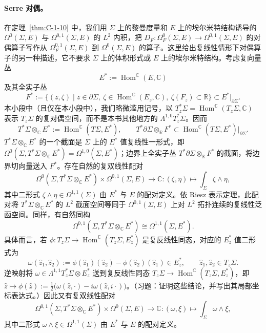 \paragraph{Serre 对偶。} 在定理~\ref{thm:C-1-10} 中，我们用 $\Sigma$ 上的黎曼度量和 $E$ 上的埃尔米特结构诱导的 $\Omega^0(\Sigma,E)$ 与 $\Omega^{0,1}(\Sigma,E)$ 的 $L^2$ 内积，把 $D_F:\Omega_F^0(\Sigma,E)\to\Omega^{0,1}(\Sigma,E)$ 的对偶算子写作从 $\Omega_F^{0,1}(\Sigma,E)$ 到 $\Omega^0(\Sigma,E)$ 的算子。这里给出复线性情形下对偶算子的另一种描述，它不要求 $\Sigma$ 上的体积形式或 $E$ 上的埃尔米特结构。考虑复向量丛
\[
  E^*:=\operatorname{Hom}^{\mathbb C}(E,\mathbb C)
\]
及其全实子丛
\[
  F^*:=\{(z,\zeta)\mid z\in\partial\Sigma,\
  \zeta\in\operatorname{Hom}^{\mathbb C}(E_z,\mathbb C),\
  \zeta(F_z)\subset\mathbb R\}\subset E^*|_{\partial\Sigma}.
\]
本小段中（且仅在本小段中），我们略微滥用记号，以 $T_z^*\Sigma=\operatorname{Hom}^{\mathbb C}(T_z\Sigma,\mathbb C)$ 表示 $T_z\Sigma$ 的复对偶空间，而不是本书其他地方的 $\Lambda^{1,0}T_z^*\Sigma$。因而
\[
  T^*\Sigma\otimes_{\mathbb C}E^*:=\operatorname{Hom}^{\mathbb C}(T\Sigma,E^*),
  \qquad
  T^*\partial\Sigma\otimes_{\mathbb R}F^*
  \subset\operatorname{Hom}^{\mathbb C}(T\Sigma,E^*)|_{\partial\Sigma}.
\]
$T^*\Sigma\otimes_{\mathbb C}E^*$ 的一个截面是 $\Sigma$ 上的 $E^*$ 值复线性一形式，即 $\Omega^0(\Sigma,T^*\Sigma\otimes_{\mathbb C}E^*)=\Omega^{1,0}(\Sigma,E^*)$；边界上全实子丛 $T^*\partial\Sigma\otimes_{\mathbb R}F^*$ 的截面，将边界切向量送入 $F^*$。存在自然的复双线性配对
\begin{equation}\label{eq:C-1-5}
  \Omega^0(\Sigma,T^*\Sigma\otimes_{\mathbb C}E^*)
  \times\Omega^{0,1}(\Sigma,E)
  \longrightarrow\mathbb C:
  (\zeta,\eta)\longmapsto\int_\Sigma\zeta\wedge\eta,
\end{equation}
其中二形式 $\zeta\wedge\eta\in\Omega^{1,1}(\Sigma)$ 由 $E^*$ 与 $E$ 的配对定义。依 Riesz 表示定理，此配对将 $T^*\Sigma\otimes_{\mathbb C}E^*$ 的 $L^2$ 截面空间等同于 $\Omega^{0,1}(\Sigma,E)$ 上对 $L^2$ 拓扑连续的复线性泛函空间。同样，有自然同构
\[
  \Omega^{0,1}(\Sigma,T^*\Sigma\otimes_{\mathbb C}E^*)
  \cong\Omega^{1,1}(\Sigma,E^*).
\]
具体而言，若 $\phi:T_z\Sigma\to\operatorname{Hom}^{\mathbb C}(T_z\Sigma,E_z^*)$ 是复反线性同态，对应的 $E_z^*$ 值二形式为
\begin{equation}\label{eq:C-1-6}
  \omega(\hat z_1,\hat z_2):=
  \phi(\hat z_1)(\hat z_2)-\phi(\hat z_2)(\hat z_1)
  \in E_z^*,\qquad \hat z_1,\hat z_2\in T_z\Sigma.
\end{equation}
逆映射将 $\omega\in\Lambda^{1,1}T_z^*\Sigma\otimes E_z^*$ 送到复反线性同态 $T_z\Sigma\to\operatorname{Hom}^{\mathbb C}(T_z\Sigma,E_z^*)$，即 $\hat z\mapsto\phi(\hat z):=\frac12\bigl(\omega(\hat z,\cdot)-i\omega(\hat z,i\cdot)\bigr)$。（习题：证明这些结论，并写出其局部坐标表达式。）因此又有复双线性配对
\begin{equation}\label{eq:C-1-7}
  \Omega^{0,1}(\Sigma,T^*\Sigma\otimes_{\mathbb C}E^*)
  \times\Omega^0(\Sigma,E)
  \longrightarrow\mathbb C:
  (\omega,\xi)\longmapsto\int_\Sigma\omega\wedge\xi,
\end{equation}
其中二形式 $\omega\wedge\xi\in\Omega^{1,1}(\Sigma)$ 由 $E^*$ 与 $E$ 的配对定义。

